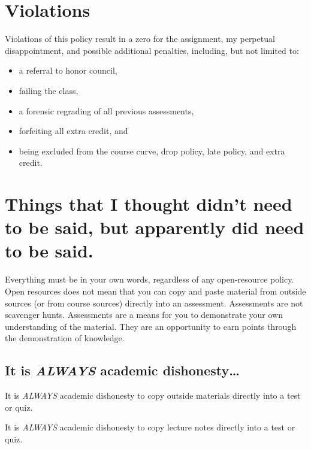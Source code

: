 \hypertarget{violations}{%
\section{Violations}\label{violations}}

Violations of this policy result in a zero for the assignment, my perpetual disappointment, and possible additional penalties, including, but not limited to:

\begin{itemize}
\tightlist
\item
  a referral to honor council,
\item
  failing the class,
\item
  a forensic regrading of all previous assessments,
\item
  forfeiting all extra credit, and
\item
  being excluded from the course curve, drop policy, late policy, and extra credit.
\end{itemize}

\hypertarget{things-that-i-thought-didnt-need-to-be-said-but-apparently-did-need-to-be-said.}{%
\section{Things that I thought didn't need to be said, but apparently did need to be said.}\label{things-that-i-thought-didnt-need-to-be-said-but-apparently-did-need-to-be-said.}}

Everything must be in your own words, regardless of any open-resource policy.
Open resources does not mean that you can copy and paste material from outside sources (or from course sources) directly into an assessment.
Assessments are not scavenger hunts.
Assessments are a means for you to demonstrate your own understanding of the material.
They are an opportunity to earn points through the demonstration of knowledge.

\hypertarget{it-is-always-academic-dishonesty}{%
\subsection{\texorpdfstring{It is \emph{ALWAYS} academic dishonesty\ldots{}}{It is ALWAYS academic dishonesty\ldots{}}}\label{it-is-always-academic-dishonesty}}

It is \emph{ALWAYS} academic dishonesty to copy outside materials directly into a test or quiz.

It is \emph{ALWAYS} academic dishonesty to copy lecture notes directly into a test or quiz.


